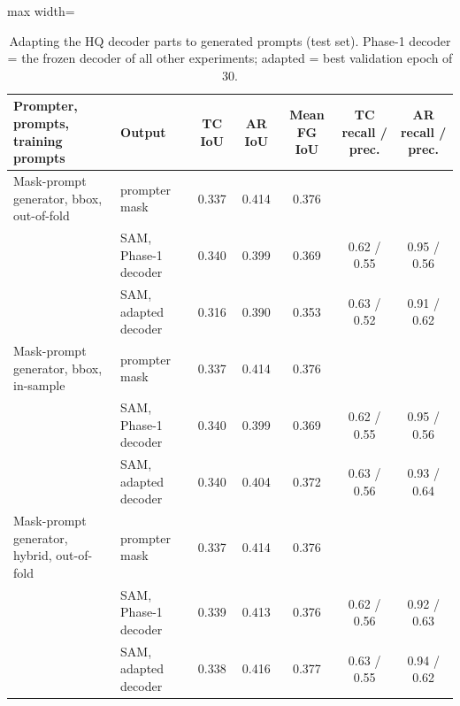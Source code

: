 \begin{table}[htbp]
\centering
\small
\begin{adjustbox}{max width=\linewidth}
\begin{tabular}{llccccc}
\toprule
Prompter, prompts, training prompts & Output & TC IoU & AR IoU & Mean FG IoU & TC recall / prec. & AR recall / prec. \\
\midrule
Mask-prompt generator, bbox, out-of-fold & prompter mask & 0.337 & 0.414 & 0.376 &  &  \\
 & SAM, Phase-1 decoder & 0.340 & 0.399 & 0.369 & 0.62 / 0.55 & 0.95 / 0.56 \\
 & SAM, adapted decoder & 0.316 & 0.390 & 0.353 & 0.63 / 0.52 & 0.91 / 0.62 \\
\midrule
Mask-prompt generator, bbox, in-sample & prompter mask & 0.337 & 0.414 & 0.376 &  &  \\
 & SAM, Phase-1 decoder & 0.340 & 0.399 & 0.369 & 0.62 / 0.55 & 0.95 / 0.56 \\
 & SAM, adapted decoder & 0.340 & 0.404 & 0.372 & 0.63 / 0.56 & 0.93 / 0.64 \\
\midrule
Mask-prompt generator, hybrid, out-of-fold & prompter mask & 0.337 & 0.414 & 0.376 &  &  \\
 & SAM, Phase-1 decoder & 0.339 & 0.413 & 0.376 & 0.62 / 0.56 & 0.92 / 0.63 \\
 & SAM, adapted decoder & 0.338 & 0.416 & 0.377 & 0.63 / 0.55 & 0.94 / 0.62 \\
\bottomrule
\end{tabular}
\end{adjustbox}
\caption{Adapting the HQ decoder parts to generated prompts (test set). Phase-1 decoder = the frozen decoder of all other experiments; adapted = best validation epoch of 30.}
\label{tab:decoder_adaptation_infused_mlp05}
\end{table}
